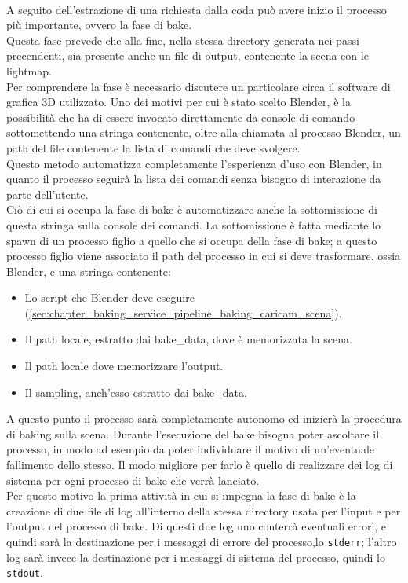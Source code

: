 \\
A seguito dell’estrazione di una richiesta dalla coda può avere inizio il processo più importante, ovvero la fase di bake. 
\\
Questa fase prevede che alla fine, nella stessa directory generata nei passi precendenti, sia presente anche un file di output, contenente la scena con le lightmap. 
\\
Per comprendere la fase è necessario discutere un particolare circa il software di grafica 3D utilizzato. Uno dei motivi per cui è stato scelto Blender, è la possibilità che ha di essere invocato direttamente da console di comando sottomettendo una stringa contenente, oltre alla chiamata al processo Blender, un path del file contenente la lista di comandi che deve svolgere. 
\\
Questo metodo automatizza completamente l’esperienza d’uso con Blender, in quanto il processo seguirà la lista dei comandi senza bisogno di interazione da parte dell’utente.
\\ 
Ciò di cui si occupa la fase di bake è automatizzare anche la sottomissione di questa stringa sulla console dei comandi. La sottomissione è fatta mediante lo spawn di un processo figlio a quello che si occupa della fase di bake; a questo processo figlio viene associato il path del processo in cui si deve trasformare, ossia Blender, e una stringa contenente:
\begin{itemize}
\item Lo script che Blender deve eseguire (\ref{sec:chapter_baking_service_pipeline_baking_caricam_scena}).
\item Il path locale, estratto dai bake\_data, dove è memorizzata la scena.
\item Il path locale dove memorizzare l’output.
\item Il sampling, anch’esso estratto dai bake\_data.
\end{itemize}
A questo punto il processo sarà completamente autonomo ed inizierà la procedura di baking sulla scena. Durante l’esecuzione del bake bisogna poter ascoltare il processo, in modo ad esempio da poter individuare il motivo di un’eventuale fallimento dello stesso. Il modo migliore per farlo è quello di realizzare dei log di sistema per ogni processo di bake che verrà lanciato.
\\ 
Per questo motivo la prima attività in cui si impegna la fase di bake è la creazione di due file di log all’interno della stessa directory usata per l’input e per l’output del processo di bake. Di questi due log uno conterrà eventuali errori, e quindi sarà la destinazione per i messaggi di errore del processo,lo \texttt{stderr}; l’altro log sarà invece la destinazione per i messaggi di sistema del processo, quindi lo \texttt{stdout}. 
